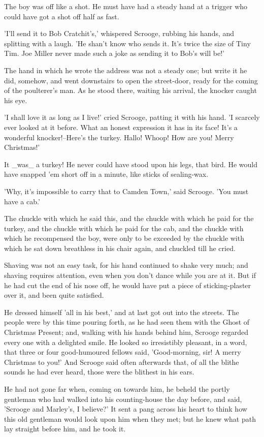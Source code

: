The boy was off like a shot. He must have had a steady hand at a trigger
who could have got a shot off half as fast.

'I'll send it to Bob Cratchit's,' whispered Scrooge, rubbing his hands,
and splitting with a laugh. 'He shan't know who sends it. It's twice the
size of Tiny Tim. Joe Miller never made such a joke as sending it to
Bob's will be!'

The hand in which he wrote the address was not a steady one; but write
it he did, somehow, and went downstairs to open the street-door, ready
for the coming of the poulterer's man. As he stood there, waiting his
arrival, the knocker caught his eye.

'I shall love it as long as I live!' cried Scrooge, patting it with his
hand. 'I scarcely ever looked at it before. What an honest expression it
has in its face! It's a wonderful knocker!--Here's the turkey. Hallo!
Whoop! How are you! Merry Christmas!'

It _was_ a turkey! He never could have stood upon his legs, that bird.
He would have snapped 'em short off in a minute, like sticks of
sealing-wax.

'Why, it's impossible to carry that to Camden Town,' said Scrooge. 'You
must have a cab.'

The chuckle with which he said this, and the chuckle with which he paid
for the turkey, and the chuckle with which he paid for the cab, and the
chuckle with which he recompensed the boy, were only to be exceeded by
the chuckle with which he sat down breathless in his chair again, and
chuckled till he cried.

Shaving was not an easy task, for his hand continued to shake very much;
and shaving requires attention, even when you don't dance while you are
at it. But if he had cut the end of his nose off, he would have put a
piece of sticking-plaster over it, and been quite satisfied.

He dressed himself 'all in his best,' and at last got out into the
streets. The people were by this time pouring forth, as he had seen them
with the Ghost of Christmas Present; and, walking with his hands behind
him, Scrooge regarded every one with a delighted smile. He looked so
irresistibly pleasant, in a word, that three or four good-humoured
fellows said, 'Good-morning, sir! A merry Christmas to you!' And Scrooge
said often afterwards that, of all the blithe sounds he had ever heard,
those were the blithest in his ears.

He had not gone far when, coming on towards him, he beheld the portly
gentleman who had walked into his counting-house the day before, and
said, 'Scrooge and Marley's, I believe?' It sent a pang across his heart
to think how this old gentleman would look upon him when they met; but
he knew what path lay straight before him, and he took it.

